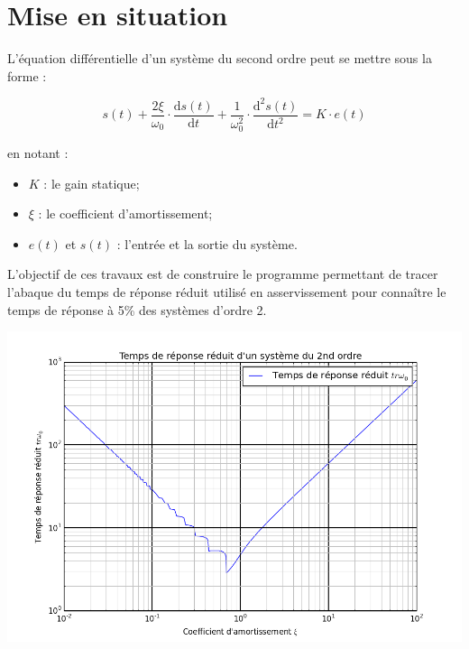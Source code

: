 \documentclass[10pt,fleqn]{article} %
\begin{document}

\vspace{2cm}
\pagestyle{fancy}
\thispagestyle{plain}

\section{Mise en situation}


L'équation différentielle d'un système du second ordre peut se mettre sous la forme :

\vspace{.25cm}

\begin{minipage}[c]{.48\linewidth}
$$
s(t)
+\dfrac{2\xi}{\omega_0}\cdot \dfrac{\text{d}s(t)}{\text{d}t}
+\dfrac{1}{\omega_0^2}\cdot \dfrac{\text{d}^2s(t)}{\text{d}t^2}
= K\cdot e(t)
$$
\end{minipage}\hfill
\begin{minipage}[c]{.48\linewidth}
en notant :
\begin{itemize}
\item $K$ : le gain statique;
\item $\xi$ : le coefficient d'amortissement;
\item $e(t)$ et $s(t)$ : l'entrée et la sortie du système. 
\end{itemize}
\end{minipage}


\begin{minipage}[c]{.48\linewidth}
\begin{obj}
L'objectif de ces travaux est de construire le programme permettant de tracer l'abaque du temps de réponse réduit utilisé en asservissement pour connaître le temps de réponse à 5\% des systèmes d'ordre 2. 
\end{obj}
\end{minipage}\hfill
\begin{minipage}[c]{.5\linewidth}
\begin{center}
\includegraphics[width=.95\textwidth]{images/figure_1}
\end{center}
\end{minipage}
\end{document}

